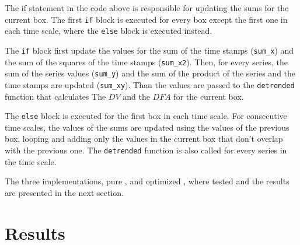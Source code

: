 \documentclass[article]{jss}
\begin{document}
The if statement in the code above is responsible for updating the sums for the current box. The first \verb"if" block is executed for
every box except the first one in each time scale, where the \verb"else" block is executed instead. 

The \verb"if" block first update the values for the sum of the time stamps (\verb"sum_x") and the sum of the squares of the time stamps (\verb"sum_x2"). Then, for every series, the sum of the series values (\verb"sum_y") and the sum of the product of the series and the time stamps are updated (\verb"sum_xy"). Than the values are passed to the \verb"detrended" function that calculates The $DV$ and the $DFA$ for the current box.

The \verb"else" block is executed for the first box in each time scale. For consecutive time scales, the values of the sums are updated using the values of the previous box, looping and adding only the values in the current box that don't overlap with the previous one. The \verb"detrended" function is also called for every series in the time scale.

The three implementations, pure ,  and optimized , where tested and the results are presented in the next section.
 


\section{Results} \label{sec:results}




\end{document}
